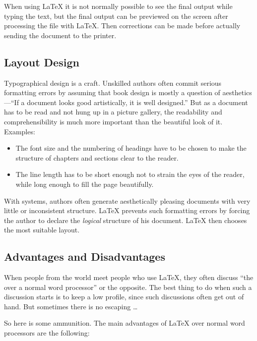 When using \LaTeX{} it is not normally possible to see the final output
while typing the text, but the final output can be previewed on the
screen after processing the file with \LaTeX. Then corrections can be
made before actually sending the document to the printer.

\subsection{Layout Design}\label{sec:layout_design}

Typographical design is a craft. Unskilled authors often commit
serious formatting errors by assuming that book design is mostly a
question of aesthetics---``If a document looks good artistically,
it is well designed.'' But as a document has to be read and not hung
up in a picture gallery, the readability and comprehensibility is
much more important than the beautiful look of it.
Examples:
\begin{itemize}
  \item The font size and the numbering of headings have to be chosen to make
        the structure of chapters and sections clear to the reader.
  \item The line length has to be short enough not to strain
        the eyes of the reader, while long enough to fill the page
        beautifully.
\end{itemize}

With  systems, authors often generate aesthetically
pleasing documents with very little or inconsistent structure.
\LaTeX{} prevents such formatting errors by forcing the author to
declare the \emph{logical} structure of his document. \LaTeX{} then
chooses the most suitable layout.

\subsection{Advantages and Disadvantages}

When people from the  world meet people who use \LaTeX{},
they often discuss ``the  over a normal
word processor'' or the opposite.  The best thing to do when such
a discussion starts is to keep a low profile, since such discussions
often get out of hand. But sometimes there is no escaping \ldots

\medskip\noindent So here is some ammunition. The main advantages
of \LaTeX{} over normal word processors are the following:

